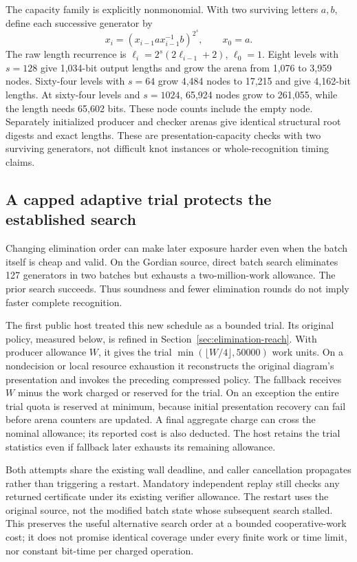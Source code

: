 The capacity family is explicitly nonmonomial. With two surviving letters
$a,b$, define each successive generator by
\[
 x_i=(x_{i-1}a x_{i-1}^{-1}b)^{2^s},\qquad x_0=a.
\]
The raw length recurrence is $\ell_i=2^s(2\ell_{i-1}+2)$, $\ell_0=1$.
Eight levels with $s=128$ give 1,034-bit output lengths and grow the arena
from 1,076 to 3,959 nodes. Sixty-four levels with $s=64$ grow 4,484 nodes
to 17,215 and give 4,162-bit lengths. At sixty-four levels and $s=1024$,
65,924 nodes grow to 261,055, while the length needs 65,602 bits.
These node counts include the empty node. Separately initialized producer
and checker arenas give identical structural root digests and exact lengths.
These are presentation-capacity checks with two surviving generators,
not difficult knot instances or whole-recognition timing claims.

\subsection{A capped adaptive trial protects the established search}

Changing elimination order can make later exposure harder even when the
batch itself is cheap and valid. On the Gordian source, direct batch search
eliminates 127 generators in two batches but exhausts a two-million-work
allowance. The prior search succeeds. Thus soundness and fewer elimination
rounds do not imply faster complete recognition.

The first public host treated this new schedule as a bounded trial. Its
original policy, measured below, is refined in
Section~\ref{sec:elimination-reach}. With producer
allowance $W$, it gives the trial $\min(\lfloor W/4\rfloor,50000)$ work
units. On a nondecision or local resource exhaustion it reconstructs the
original diagram's presentation and invokes the preceding compressed
policy. The fallback receives $W$ minus the work charged or reserved for
the trial. On an exception the entire trial quota is reserved at minimum,
because initial presentation recovery can fail before arena counters are
updated. A final aggregate charge can cross the nominal allowance; its
reported cost is also deducted. The host retains the trial statistics even
if fallback later exhausts its remaining allowance.

Both attempts share the existing wall deadline, and caller cancellation
propagates rather than triggering a restart. Mandatory independent replay
still checks any returned certificate under its existing verifier allowance.
The restart uses the original source, not the modified batch state whose
subsequent search stalled. This preserves the useful alternative search
order at a bounded cooperative-work cost; it does not promise identical
coverage under every finite work or time limit, nor constant bit-time per
charged operation.

